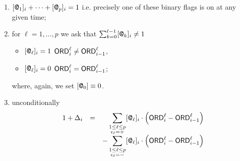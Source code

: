 \begin{enumerate}
	\item $[\textsf{@}_{1}]_{i} + \cdots + [\textsf{@}_{p}]_{i} = 1$ i.e. precisely one of these binary flags is on at any given time;
	\item for $\ell = 1, \dots, p$ we ask that
		\If $\sum_{k = 0}^{\ell-1} [\textsf{@}_{k}]_{i} \neq 1$ \Then 
		\begin{itemize}
			\item  \If $[\textsf{@}_{\ell}]_{i} = 1$ \Then $\textsf{ORD}^\ell_{i} \neq \textsf{ORD}^\ell_{i - 1}$,
			\item  \If $[\textsf{@}_{\ell}]_{i} = 0$ \Then $\textsf{ORD}^\ell_{i} =    \textsf{ORD}^\ell_{i - 1}$;
		\end{itemize}
		where, again, we set $[\textsf{@}_0] \equiv 0$.
	\item unconditionally
		\[
			\begin{array}{lcl}
				1 + \Delta_{i}
				& = & 
				\displaystyle
				\phantom{+} \sum_{\substack{1\leq \ell \leq p\\\epsilon_\ell = +}}
				[\textsf{@}_{\ell}]_{i}
				\cdot
				\Big(
				\textsf{ORD}^\ell_{i} - \textsf{ORD}^\ell_{i - 1}
				\Big) \\
				& &
				\displaystyle
				-
				\sum_{\substack{1\leq \ell \leq p\\\epsilon_\ell = -}}
				[\textsf{@}_{\ell}]_{i}
				\cdot
				\Big(
				\textsf{ORD}^\ell_{i} - \textsf{ORD}^\ell_{i - 1}
				\Big)
			\end{array}
		\]
\end{enumerate}

